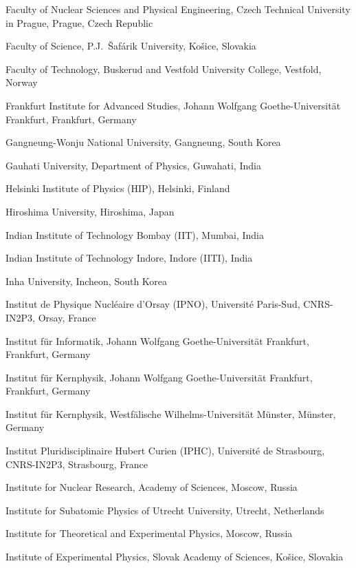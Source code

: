 \begin{flushleft}
\begin{Authlist}
\item {}Faculty of Nuclear Sciences and Physical Engineering, Czech Technical University in Prague, Prague, Czech Republic
\item {}Faculty of Science, P.J.~\v{S}af\'{a}rik University, Ko\v{s}ice, Slovakia
\item {}Faculty of Technology, Buskerud and Vestfold University College, Vestfold, Norway
\item {}Frankfurt Institute for Advanced Studies, Johann Wolfgang Goethe-Universit\"{a}t Frankfurt, Frankfurt, Germany
\item {}Gangneung-Wonju National University, Gangneung, South Korea
\item {}Gauhati University, Department of Physics, Guwahati, India
\item {}Helsinki Institute of Physics (HIP), Helsinki, Finland
\item {}Hiroshima University, Hiroshima, Japan
\item {}Indian Institute of Technology Bombay (IIT), Mumbai, India
\item {}Indian Institute of Technology Indore, Indore (IITI), India
\item {}Inha University, Incheon, South Korea
\item {}Institut de Physique Nucl\'eaire d'Orsay (IPNO), Universit\'e Paris-Sud, CNRS-IN2P3, Orsay, France
\item {}Institut f\"{u}r Informatik, Johann Wolfgang Goethe-Universit\"{a}t Frankfurt, Frankfurt, Germany
\item {}Institut f\"{u}r Kernphysik, Johann Wolfgang Goethe-Universit\"{a}t Frankfurt, Frankfurt, Germany
\item {}Institut f\"{u}r Kernphysik, Westf\"{a}lische Wilhelms-Universit\"{a}t M\"{u}nster, M\"{u}nster, Germany
\item {}Institut Pluridisciplinaire Hubert Curien (IPHC), Universit\'{e} de Strasbourg, CNRS-IN2P3, Strasbourg, France
\item {}Institute for Nuclear Research, Academy of Sciences, Moscow, Russia
\item {}Institute for Subatomic Physics of Utrecht University, Utrecht, Netherlands
\item {}Institute for Theoretical and Experimental Physics, Moscow, Russia
\item {}Institute of Experimental Physics, Slovak Academy of Sciences, Ko\v{s}ice, Slovakia

\end{Authlist}
\end{flushleft}
